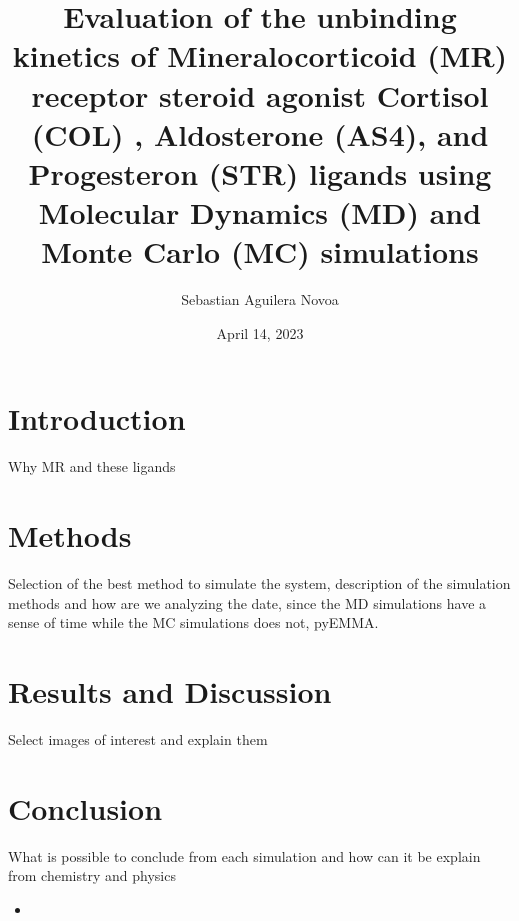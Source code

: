 \documentclass[letter,10pt, twocolumn]{article}
\title{Evaluation of the unbinding kinetics of Mineralocorticoid (MR) receptor steroid agonist Cortisol (COL) , Aldosterone (AS4), and Progesteron (STR) ligands using Molecular Dynamics (MD) and Monte Carlo (MC) simulations}
\author{Sebastian Aguilera Novoa}
\date{April 14, 2023}
\begin{document}




\section{Introduction}

Why MR and these ligands

\section{Methods}

Selection of the best method to simulate the system, description of the simulation methods and how are we analyzing the date, since the MD simulations have a sense of time while the MC simulations does not, pyEMMA.



\section{Results and Discussion}

Select images of interest and explain them


\section{Conclusion}

What is possible to conclude from each simulation and how can it be explain from chemistry and physics

\begin{itemize}

\item 

\end{itemize}


\clearpage
\onecolumn{

\nocite{*}}
\end{document}

